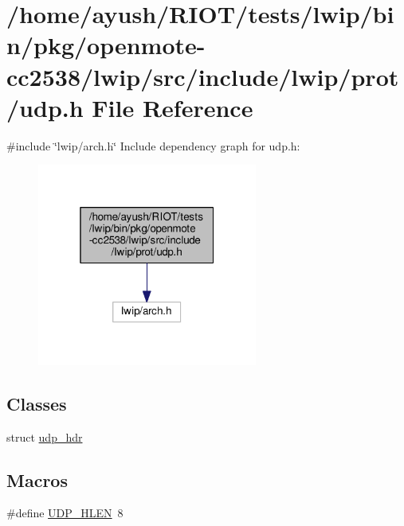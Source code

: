 \hypertarget{openmote-cc2538_2lwip_2src_2include_2lwip_2prot_2udp_8h}{}\section{/home/ayush/\+R\+I\+O\+T/tests/lwip/bin/pkg/openmote-\/cc2538/lwip/src/include/lwip/prot/udp.h File Reference}
\label{openmote-cc2538_2lwip_2src_2include_2lwip_2prot_2udp_8h}
{\ttfamily \#include \char`\"{}lwip/arch.\+h\char`\"{}}\newline
Include dependency graph for udp.\+h\+:
\nopagebreak
\begin{figure}[H]
\begin{center}
\leavevmode
\includegraphics[width=205pt]{openmote-cc2538_2lwip_2src_2include_2lwip_2prot_2udp_8h__incl}
\end{center}
\end{figure}
\subsection*{Classes}
\begin{DoxyCompactItemize}
\item 
struct \hyperlink{structudp__hdr}{udp\+\_\+hdr}
\end{DoxyCompactItemize}
\subsection*{Macros}
\begin{DoxyCompactItemize}
\item 
\#define \hyperlink{openmote-cc2538_2lwip_2src_2include_2lwip_2prot_2udp_8h_a5e211e5d295f6e70dee42f3083f89e71}{U\+D\+P\+\_\+\+H\+L\+EN}~8
\end{DoxyCompactItemize}
